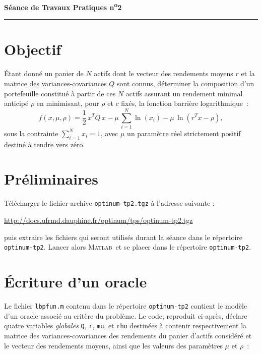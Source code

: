 \documentclass[10pt,a4paper,fleqn]{report}
\makeatletter
\def\cleardoublepage{\clearpage\if@twoside\ifodd\c@page\else\hbox{}\thispagestyle{empty}\newpage\fi\fi}
\newcommand{\matlab}{\textsc{Matlab}}
\renewcommand{\tt}{\texttt}
\makeatother
\begin{document}
\cleardoublepage



\begin{center}

\textbf{\huge S\'{e}ance de Travaux Pratiques  n\textsuperscript{o}2}

\smallskip

\rule{10cm}{0.4pt}

\end{center}


\section*{Objectif}
\'Etant donn\'e un panier de $N$ actifs dont le vecteur des rendements moyens $r$ et la matrice des variances-covariances $Q$ sont connus, d\'eterminer la composition d'un portefeuille constitu\'e \`a partir de ces $N$ actifs assurant un rendement minimal anticip\'e $\rho$ en minimisant, pour $\rho$ et $c$ fix\'es, la fonction barri\`ere logarithmique~:
\[
f(x,\mu,\rho)=\frac{1}{2}\,x^TQ\,x-\mu\,\sum_{i=1}^N\ln(x_i)-\mu\,\ln\left(r^Tx-\rho\right),
\]
sous la contrainte $\sum_{i=1}^N x_i=1$, avec $\mu$ un param\`etre r\'eel strictement positif destin\'e \`a tendre vers z\'ero.


\section{Pr\'{e}liminaires}
T\'{e}l\'{e}charger le fichier-archive \tt{optinum-tp2.tgz} \`{a} l'adresse suivante :

\centerline{\url{http://docs.ufrmd.dauphine.fr/optinum/tps/optinum-tp2.tgz}}
puis extraire les fichiers qui seront utilis\'{e}s durant la s\'{e}ance dans le r\'{e}pertoire
\tt{optinum-tp2}. Lancer alors \matlab\ et se placer dans le r\'{e}pertoire \tt{optinum-tp2}.

\section{\'Ecriture d'un oracle}

Le fichier \texttt{lbpfun.m} contenu dans le répertoire
\tt{optinum-tp2} contient le modèle d'un oracle associé au critère du
problème. Le code, reproduit ci-après,  déclare quatre variables
\textit{globales} \tt{Q}, \tt r, \tt{mu}, et \tt{rho} destin\'ees
\`a contenir respectivement la matrice des variances-covariances des
rendements du panier d'actifs consid\'er\'e et le vecteur des
rendements moyens, ainsi que les valeurs des paramètres $\mu$ et $\rho$~:
\end{document}
